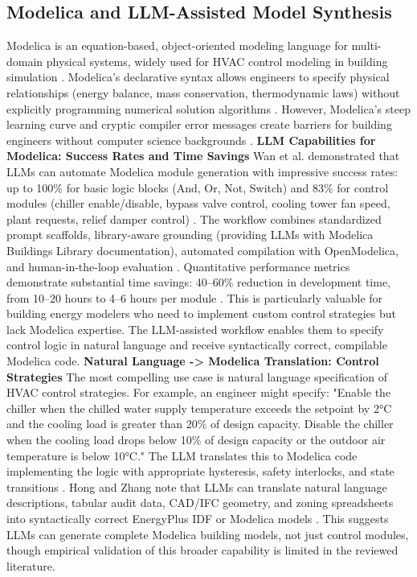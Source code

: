 \documentclass[12pt,a4paper]{article}
\begin{document}
\subsection{Modelica and LLM-Assisted Model Synthesis}
Modelica is an equation-based, object-oriented modeling language for multi-domain physical systems, widely used for HVAC control modeling in building simulation \cite{ref61}. Modelica's declarative syntax allows engineers to specify physical relationships (energy balance, mass conservation, thermodynamic laws) without explicitly programming numerical solution algorithms \cite{ref61}. However, Modelica's steep learning curve and cryptic compiler error messages create barriers for building engineers without computer science backgrounds \cite{ref61}.
\textbf{LLM Capabilities for Modelica: Success Rates and Time Savings}
Wan et al. demonstrated that LLMs can automate Modelica module generation with impressive success rates: up to 100\% for basic logic blocks (And, Or, Not, Switch) and 83\% for control modules (chiller enable/disable, bypass valve control, cooling tower fan speed, plant requests, relief damper control) \cite{ref61}. The workflow combines standardized prompt scaffolds, library-aware grounding (providing LLMs with Modelica Buildings Library documentation), automated compilation with OpenModelica, and human-in-the-loop evaluation \cite{ref61}.
Quantitative performance metrics demonstrate substantial time savings: 40--60\% reduction in development time, from 10--20 hours to 4--6 hours per module \cite{ref61}. This is particularly valuable for building energy modelers who need to implement custom control strategies but lack Modelica expertise. The LLM-assisted workflow enables them to specify control logic in natural language and receive syntactically correct, compilable Modelica code.
\textbf{Natural Language -> Modelica Translation: Control Strategies}
The most compelling use case is natural language specification of HVAC control strategies. For example, an engineer might specify: "Enable the chiller when the chilled water supply temperature exceeds the setpoint by 2°C and the cooling load is greater than 20\% of design capacity. Disable the chiller when the cooling load drops below 10\% of design capacity or the outdoor air temperature is below 10°C." The LLM translates this to Modelica code implementing the logic with appropriate hysteresis, safety interlocks, and state transitions \cite{ref61}.
Hong and Zhang note that LLMs can translate natural language descriptions, tabular audit data, CAD/IFC geometry, and zoning spreadsheets into syntactically correct EnergyPlus IDF or Modelica models \cite{ref2}. This suggests LLMs can generate complete Modelica building models, not just control modules, though empirical validation of this broader capability is limited in the reviewed literature.
\end{document}

